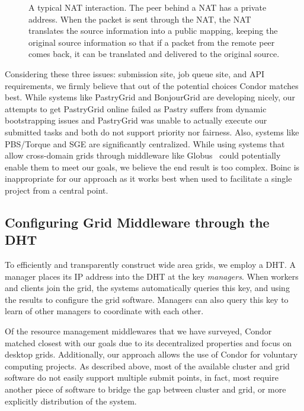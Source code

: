 \documentclass[conference]{IEEEtran}
\begin{document}
\begin{figure}[h!t!]
\centering
{}
\caption{A typical NAT interaction. The peer behind a NAT has a private address.
When the packet is sent through the NAT, the NAT translates the source information
into a public mapping, keeping the original source information so that if a
packet from the remote peer comes back, it can be translated and delivered to
the original source.}
\label{fig:nat}
\end{figure}

Considering these three issues:  submission site, job queue site, and API
requirements, we firmly believe that out of the potential choices Condor
matches best.  While systems like PastryGrid and BonjourGrid are developing
nicely, our attempts to get PastryGrid online failed as Pastry suffers from
dynamic bootstrapping issues and PastryGrid was unable to actually execute our
submitted tasks and both do not support priority nor fairness.  Also, systems
like PBS/Torque and SGE are significantly centralized.  While using systems
that allow cross-domain grids through middleware like Globus~\cite{globus}
could potentially enable them to meet our goals, we believe the end result is
too complex.  Boinc is inappropriate for our approach as it works best when
used to facilitate a single project from a central point.

\subsection{Configuring Grid Middleware through the DHT}
\label{condor}

To efficiently and transparently construct wide area grids, we employ a DHT.  A
manager places its IP address into the DHT at the key \emph{managers}.  When
workers and clients join the grid, the systems automatically queries this key,
and using the results to configure the grid software.  Managers can also query
this key to learn of other managers to coordinate with each other.

Of the resource management middlewares that we have surveyed, Condor matched
closest with our goals due to its decentralized properties and focus on desktop
grids.  Additionally, our approach allows the use of Condor for voluntary
computing projects.  As described above, most of the available cluster and grid
software do not easily support multiple submit points, in fact, most require
another piece of software to bridge the gap between cluster and grid, or more
explicitly distribution of the system.
\end{document}
